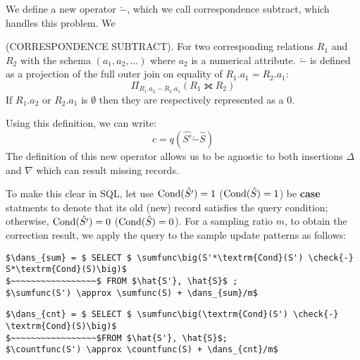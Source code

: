 We define a new operator $\check{-}$, which we call correspondence subtract, which handles this problem.
We 

\begin{definition} (CORRESPONDENCE SUBTRACT). For two corresponding relations $R_1$ and $R_2$ with the schema $(a_1, a_2, ...)$ where 
$a_2$ is a numerical attribute. $\check{-}$ is defined as a projection of the full outer join on equality of $R_1.a_1 = R_2.a_1$: \[ \Pi_{R_1.a_2 - R_1.a_1} ( R_1 \fullouterjoin R_2 ) \]
 If $R_1.a_2$ or $R_2.a_1$ is $\emptyset$ then they are respectively represented as a $0$.
\end{definition}
Using this definition, we can write:
\[ c = q(\hat{S'} \check{-} \hat{S})\]  
The definition of this new operator allows us to be agnostic to both insertions $\Delta$ and $\nabla$  which can result missing records.

To make this clear in SQL, let use $\textrm{Cond}(\hat{S'})=1$ ($\textrm{Cond}(\hat{S})=1$) be \textbf{case} statments to denote that its old (new) record satisfies the query condition; otherwise, $\textrm{Cond}(\hat{S'})=0$ ($\textrm{Cond}(\hat{S})=0$). 
For a sampling ratio $m$, to obtain the correction result, we apply the query to the sample update patterns as follows:

\begin{lstlisting}[mathescape,basicstyle={\scriptsize}]
$\dans_{sum} = $ SELECT $ \sumfunc\big(S'*\textrm{Cond}(S') \check{-} S*\textrm{Cond}(S)\big)$ 
$~~~~~~~~~~~~~~~~~$ FROM $\hat{S'}, \hat{S}$ ;
$\sumfunc(S') \approx \sumfunc(S) + \dans_{sum}/m$
\end{lstlisting}

\begin{lstlisting}[mathescape,basicstyle={\scriptsize}]
$\dans_{cnt} = $ SELECT $ \sumfunc\big(\textrm{Cond}(S') \check{-} \textrm{Cond}(S)\big)$ 
$~~~~~~~~~~~~~~~~~$FROM $\hat{S'}, \hat{S}$;
$\countfunc(S') \approx \countfunc(S) + \dans_{cnt}/m$
\end{lstlisting}



